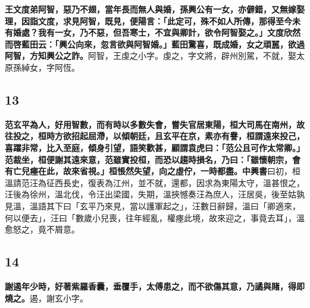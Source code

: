 \textbf{王文度弟阿智，惡乃不翅，當年長而無人與婚，孫興公有一女，亦僻錯，又無嫁娶理，因詣文度，求見阿智，既見，便陽言：「此定可，殊不如人所傳，那得至今未有婚處？我有一女，乃不惡，但吾寒士，不宜與卿計，欲令阿智娶之。」文度欣然而啓藍田云：「興公向來，忽言欲與阿智婚。」藍田驚喜，既成婚，女之頑嚚，欲過阿智，方知興公之詐。}{\footnotesize 阿智，王虔之小字。虔之，字文將，辟州別駕，不就，娶太原孫綽女，字阿恆。}

\subsection*{13}

\textbf{范玄平為人，好用智數，而有時以多數失會，嘗失官居東陽，桓大司馬在南州，故往投之，桓時方欲招起屈滯，以傾朝廷，且玄平在京，素亦有譽，桓謂遠來投己，喜躍非常，比入至庭，傾身引望，語笑歡甚，顧謂袁虎曰：「范公且可作太常卿。」范裁坐，桓便謝其遠來意，范雖實投桓，而恐以趨時損名，乃曰：「雖懷朝宗，會有亡兒瘞在此，故來省視。」桓悵然失望，向之虛佇，一時都盡。}{\footnotesize \textbf{中興書}曰初，桓溫請范汪為征西長史，復表為江州，並不就，還都，因求為東陽太守，溫甚恨之，汪後為徐州，溫北伐，令汪出梁國，失期，溫挾憾奏汪為庶人，汪居吳，後至姑孰見溫，溫語其下曰「玄平乃來見，當以護軍起之」，汪數日辭歸，溫曰「卿適來，何以便去」，汪曰「數歲小兒喪，往年經亂，權瘞此境，故來迎之，事竟去耳」，溫愈怒之，竟不屑意。}

\subsection*{14}

\textbf{謝遏年少時，好著紫羅香囊，垂覆手，太傅患之，而不欲傷其意，乃譎與賭，得即燒之。}{\footnotesize 遏，謝玄小字。}